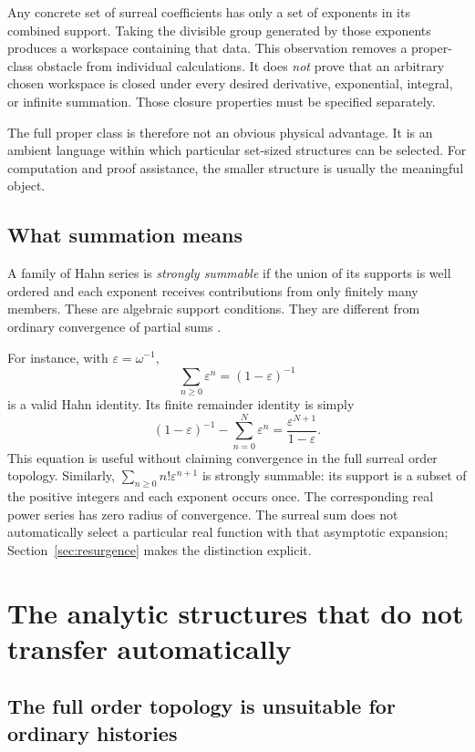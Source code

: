 \documentclass[11pt,letterpaper]{article}
\newcommand{\eps}{\varepsilon}
\theoremstyle{definition}
\theoremstyle{remark}
\begin{document}
Any concrete set of surreal coefficients has only a set of exponents in its
combined support. Taking the divisible group generated by those exponents
produces a workspace containing that data. This observation removes a
proper-class obstacle from individual calculations. It does \emph{not} prove
that an arbitrary chosen workspace is closed under every desired derivative,
exponential, integral, or infinite summation. Those closure properties must be
specified separately.

The full proper class is therefore not an obvious physical advantage. It is
an ambient language within which particular set-sized structures can be
selected. For computation and proof assistance, the smaller structure is
usually the meaningful object.

\subsection{What summation means}

A family of Hahn series is \emph{strongly summable} if the union of its supports
is well ordered and each exponent receives contributions from only finitely
many members. These are algebraic support conditions. They are different from
ordinary convergence of partial sums \cite{Gonshor,RepoAnalysis}.

For instance, with $\eps=\omega^{-1}$,
\[
 \sum_{n\geq0}\eps^n=(1-\eps)^{-1}
\]
is a valid Hahn identity. Its finite remainder identity is simply
\begin{equation}
 (1-\eps)^{-1}-\sum_{n=0}^{N}\eps^n
   =\frac{\eps^{N+1}}{1-\eps}.
 \label{eq:geom}
\end{equation}
This equation is useful without claiming convergence in the full surreal order
topology. Similarly, $\sum_{n\geq0}n!\eps^{n+1}$ is strongly summable: its
support is a subset of the positive integers and each exponent occurs once.
The corresponding real power series has zero radius of convergence. The
surreal sum does not automatically select a particular real function with
that asymptotic expansion; Section~\ref{sec:resurgence} makes the distinction
explicit.

\section{The analytic structures that do not transfer automatically}
\label{sec:analysis}

\subsection{The full order topology is unsuitable for ordinary histories}
\end{document}
